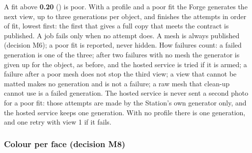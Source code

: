 \documentclass[10pt]{article}
\newcommand{\cd}{\path}
\begin{document}
A fit above \textbf{0.20} (\cd{FORGE_POOR_FIT}) is poor. With a profile and a poor fit the Forge generates the next view, up to three generations per object, and finishes the attempts in order of fit, lowest first: the first that gives a full copy that meets the contract is published. A job fails only when no attempt does. A mesh is always published (decision M6); a poor fit is reported, never hidden. How failures count: a failed generation is one of the three; after two failures with no mesh the generator is given up for the object, as before, and the hosted service is tried if it is armed; a failure after a poor mesh does not stop the third view; a view that cannot be matted makes no generation and is not a failure; a raw mesh that clean-up cannot use is a failed generation. The hosted service is never sent a second photo for a poor fit: those attempts are made by the Station's own generator only, and the hosted service keeps one generation. With no profile there is one generation, and one retry with view 1 if it fails.

\subsubsection{Colour per face (decision M8)}
\end{document}
